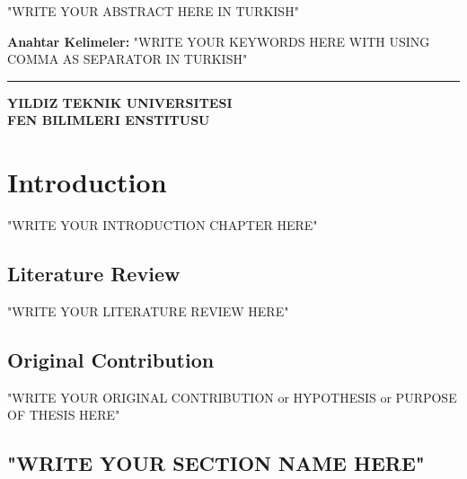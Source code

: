 \documentclass[12pt]{report}
\begin{document}
\begin{singlespacing}
"WRITE YOUR ABSTRACT HERE IN TURKISH"

\vspace{2.5cm}
\textbf{Anahtar Kelimeler:} "WRITE YOUR KEYWORDS HERE WITH USING COMMA AS SEPARATOR IN TURKISH"
\end{singlespacing}

\vspace{1ex}
\hrule
\begin{flushright}
\textbf{YILDIZ TEKNIK UNIVERSITESI \\ FEN BILIMLERI ENSTITUSU}
\end{flushright}

{}

\chapter{Introduction} %
"WRITE YOUR INTRODUCTION CHAPTER HERE"

\section{Literature Review} %
\label{sec: literature review}
"WRITE YOUR LITERATURE REVIEW HERE"

\section{Original Contribution} %
\label{sec: original}
"WRITE YOUR ORIGINAL CONTRIBUTION or HYPOTHESIS or PURPOSE OF THESIS HERE"

\section{"WRITE YOUR SECTION NAME HERE"}
\label{sec: "WRITE YOUR SECTION LABEL HERE"}
\end{document}
